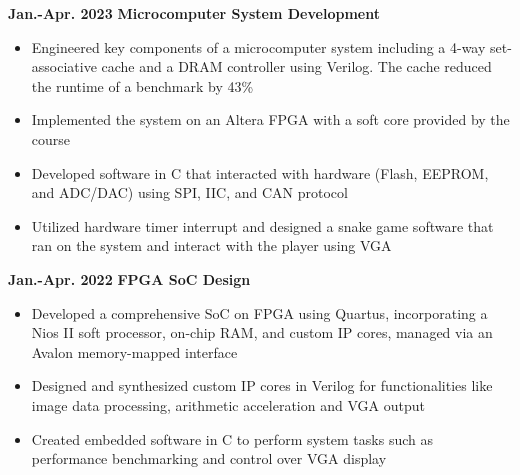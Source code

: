 \documentclass[11pt,a4paper,sans]{moderncv}
\begin{document}
\cventry
{\textnormal{\textbf{Jan.-Apr. 2023}}}
{\textnormal{\textbf{Microcomputer System Development}}}
{}{}{}
{
    \begin{itemize}
    \item Engineered key components of a microcomputer system including a 4-way set-associative cache and a DRAM controller using Verilog. The cache reduced the runtime of a benchmark by 43\%
    \item Implemented the system on an Altera FPGA with a soft core provided by the course 
    \item Developed software in C that interacted with hardware (Flash, EEPROM, and ADC/DAC) using SPI, IIC, and CAN protocol 
    \item Utilized hardware timer interrupt and designed a snake game software that ran on the system and interact with the player using VGA
    \end{itemize}
}

\cventry
{\textnormal{\textbf{Jan.-Apr. 2022}}}
{\textnormal{\textbf{FPGA SoC Design}}}
{}{}{}
{
    \begin{itemize}
    \item Developed a comprehensive SoC on FPGA using Quartus, incorporating a Nios II soft processor, on-chip RAM, and custom IP cores, managed via an Avalon memory-mapped interface
    \item Designed and synthesized custom IP cores in Verilog for functionalities like image data processing, arithmetic acceleration and VGA output
    \item Created embedded software in C to perform system tasks such as performance benchmarking and control over VGA display
    \end{itemize}
}

\end{document}
